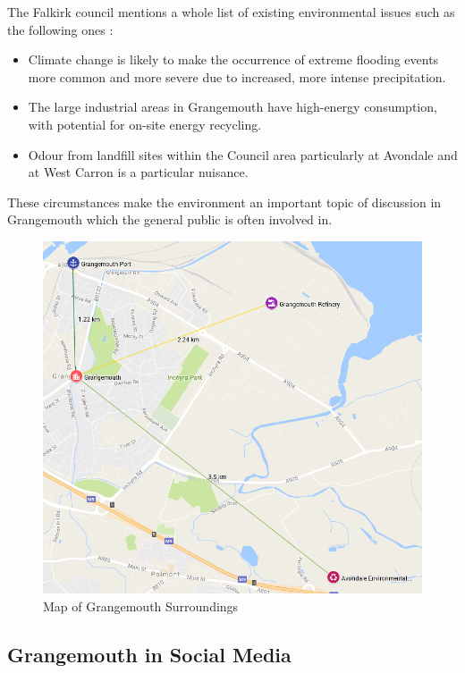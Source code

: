 The Falkirk council mentions a whole list of existing environmental issues such as the following ones \cite{grangemouthenvironment}:
\begin{itemize}
    \item Climate change is likely to make the occurrence of extreme flooding
events more common and more severe due to increased, more intense
precipitation. 
    \item The large industrial areas in Grangemouth have high-energy
consumption, with potential for on-site energy recycling.
    \item Odour from landfill sites within the Council area particularly at Avondale
and at West Carron is a particular nuisance. 
\end{itemize} 

These circumstances make the environment an important topic of discussion in Grangemouth which the general public is often involved in. 

\begin{figure}
    \centering
    \includegraphics[width=\textwidth]{data/grangemouthmap}
    \caption{Map of Grangemouth Surroundings}
    \label{fig:grangemouthmap}
\end{figure}


\subsection{Grangemouth in Social Media}
\label{subsec:media}

